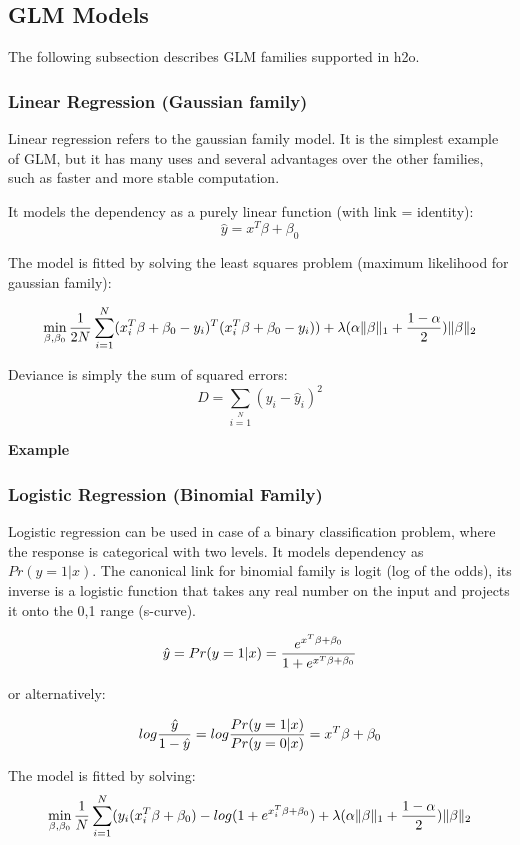 \documentclass[11pt]{article}
\begin{document}
\subsection{GLM Models} 
The following subsection describes GLM families supported in h2o. 

\subsubsection{Linear Regression (Gaussian family) }
Linear regression refers to the gaussian family model. It is the simplest example of GLM, but it has many uses and several advantages over the other families, such as faster and more stable computation. 

It models the dependency as a purely linear function (with link = identity):
\[ \hat{y} = x^T\beta + \beta_0\]

The model is fitted by solving the least squares problem (maximum likelihood for gaussian family):

\[ \min\limits_{\beta,\beta_0} { {1 \over 2N}\sum\limits_{i=1}\limits^{N}(x_i^{T}\beta  + \beta_0- y_i)^T (x_i^{T}\beta + \beta_0 - y_i))  + \lambda (\alpha \|\beta \|_1 + {1-\alpha \over 2}) \|\beta\|_2} \]


Deviance is simply the sum of squared errors:
\[ D = \sum\limits_{i=1}\limits^{N}{(y_i - \hat{y}_i)^2} \]


\textbf{Example}



\subsubsection{Logistic Regression (Binomial Family)}
Logistic regression can be used in case of a binary classification problem, where the response is categorical with two levels. It models dependency as $Pr(y = 1|x)$. The canonical link for binomial family is logit (log of the odds), its inverse is a logistic function that takes any real number on the input and projects it onto the 0,1 range (s-curve). 

\[ \hat{y} = Pr(y = 1|x) = {e^{x^T\beta + \beta_0} \over 1 + e^{x^T \beta + \beta_0} } \]

or alternatively:


\[log {\hat{y} \over 1- \hat{y}} = log{Pr(y=1|x) \over Pr(y=0|x)} = x^T \beta + \beta_0\]

The model is fitted by solving:
\[  \min\limits_{\beta,\beta_0} { {1 \over N}\sum\limits_{i=1}\limits^{N}(y_i (x_i^{T}\beta  + \beta_0) - log (1 + e^{x_i^{T}\beta  + \beta_0} )  + \lambda (\alpha \|\beta \|_1 + {1-\alpha \over 2}) \|\beta\|_2} \]
\end{document}
